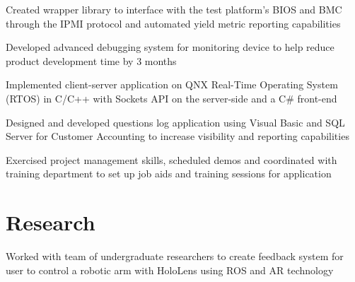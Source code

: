 \documentclass[]{deedy-resume-openfont}
\begin{document}
\begin{minipage}[t]{0.66\textwidth}
\begin{tightemize}
\item Created wrapper library to interface with the test platform’s BIOS and BMC through the IPMI protocol and automated yield metric reporting capabilities
\end{tightemize}
\sectionsep

\begin{tightemize}
\item Developed advanced debugging system for monitoring device to help reduce product development time by 3 months\item Implemented client-server application on QNX Real-Time Operating System (RTOS) in C/C++ with Sockets API on the server-side and  a C\# front-end \end{tightemize}
\sectionsep

\begin{tightemize}
\item Designed and developed questions log application using Visual Basic and SQL Server for Customer Accounting to increase visibility and reporting capabilities \item	Exercised project management skills, scheduled demos and coordinated with training department to set up job aids and training sessions for application \end{tightemize}
\sectionsep


\section{Research}
\begin{tightemize}
\item Worked with team of undergraduate researchers to create feedback system for user to control a robotic arm with HoloLens using ROS and AR technology
\end{tightemize}


\end{minipage}
\end{document}
